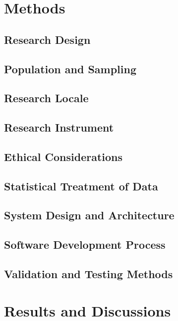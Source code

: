 \documentclass{research}
\begin{document}
\chapter{Methods}

\section{Research Design}

\section{Population and Sampling}

\section{Research Locale}

\section{Research Instrument}

\section{Ethical Considerations}

\section{Statistical Treatment of Data}

\section{System Design and Architecture}

\section{Software Development Process}

\section{Validation and Testing Methods}

\clearpage

\chapter{Results and Discussions}
\end{document}
